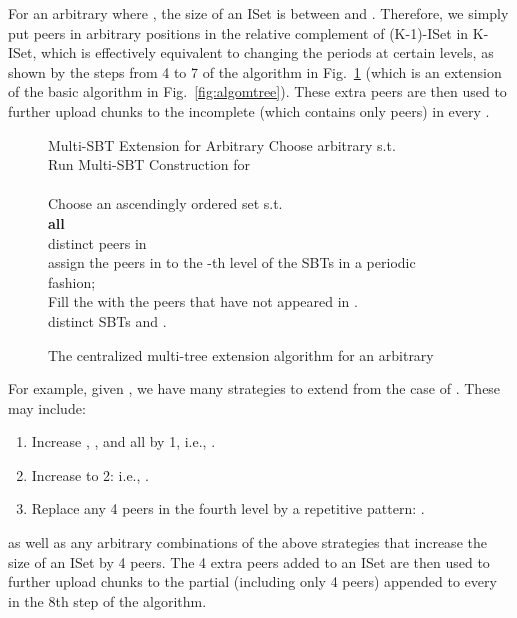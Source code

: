 \documentclass[conference]{IEEEtran}
\begin{document}
  For an arbitrary  where , the size of an ISet is between  and . Therefore, we simply put  peers in arbitrary positions in the relative complement of (K-1)\mbox{-ISet} in K\mbox{-ISet}, which is effectively equivalent to changing the periods at certain levels, as shown by the steps from 4 to 7 of the algorithm in Fig.~\ref{fig:algomtreeplus} (which is an extension of the basic algorithm in Fig.~\ref{fig:algomtree}). These extra peers are then used to further upload chunks to the incomplete  (which contains only  peers) in every .
\begin{figure}[htb]
  \begin{algorithm}{Multi-SBT Extension for Arbitrary }{
  \label{algo:algoext}}
Choose arbitrary  s.t.  \\
  Run Multi-SBT Construction for  \\
   \\
  Choose an ascendingly ordered set  s.t.  \\
  \qfor \textbf{all}  \\
     distinct peers in  \\
    \qdo assign the peers in  to the -th level of the SBTs in a periodic fashion;~~ \qrof\\
  Fill the  with the peers that have not appeared in .\\
  \qreturn  distinct SBTs and .
  \end{algorithm}
  \caption{The centralized multi-tree extension algorithm for an arbitrary } \label{fig:algomtreeplus}
  \end{figure}
For example, given , we have many strategies to extend from the case of . These may include:
\begin{enumerate}
\item Increase , , and  all by 1, i.e., .
\item Increase  to 2: i.e., .
\item Replace any 4 peers in the fourth level by a repetitive pattern: .
\end{enumerate}
as well as any arbitrary combinations of the above strategies that increase the size of an ISet by 4 peers. The 4 extra peers added to an ISet are then used to further upload chunks to the partial  (including only 4 peers) appended to every  in the 8th step of the algorithm.
\end{document}
